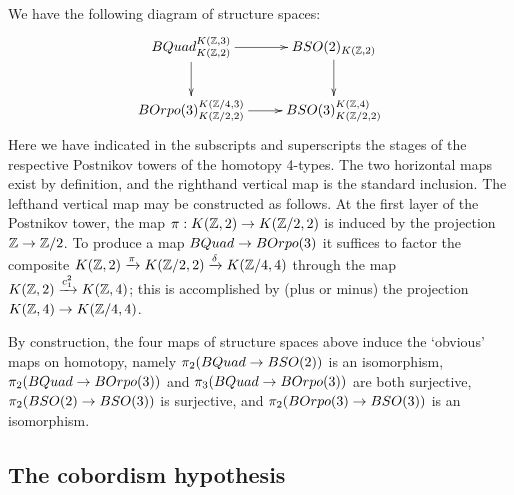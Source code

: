 \documentclass{amsart}
\begin{document}
We have the following diagram of structure spaces:
\begin{equation} \nn
\xymatrix{
BQuad_{K(\ZZ,2)}^{K(\ZZ,3)} \ar[r] \ar[d] & BSO(2)_{K(\ZZ,2)} \ar[d] \\
BOrpo(3)_{K(\ZZ/2,2)}^{K(\ZZ/4,3)} \ar[r] & BSO(3)_{K(\ZZ/2,2)}^{K(\ZZ,4)}
}
\end{equation}
Here we have indicated in the subscripts and superscripts the stages of the respective Postnikov towers of the homotopy 4-types.  The two horizontal maps exist by definition, and the righthand vertical map is the standard inclusion.  The lefthand vertical map may be constructed as follows.  At the first layer of the Postnikov tower, the map $\pi: K(\mathbb Z,2) \rightarrow K(\mathbb Z/2,2)$ is induced by the projection $\mathbb Z \rightarrow \mathbb Z/2$.  To produce a map $BQuad \rightarrow BOrpo(3)$ it suffices to factor the composite $K(\mathbb Z,2) \xrightarrow{\pi} K(\mathbb Z/2,2) \xrightarrow{\delta} K(\mathbb Z/4,4)$ through the map $K(\mathbb Z,2) \xrightarrow{c_1^2} K(\mathbb Z,4)$; this is accomplished by (plus or minus) the projection $K(\mathbb Z,4) \rightarrow K(\mathbb Z/4,4)$.  %

By construction, the four maps of structure spaces above induce the `obvious' maps on homotopy, namely $\pi_2(BQuad \rightarrow BSO(2))$ is an isomorphism, $\pi_2(BQuad \rightarrow BOrpo(3))$ and $\pi_3(BQuad \rightarrow BOrpo(3))$ are both surjective, $\pi_2(BSO(2) \rightarrow BSO(3))$ is surjective, and $\pi_2(BOrpo(3) \rightarrow BSO(3))$ is an isomorphism.  

\subsection{The cobordism hypothesis}
\end{document}
